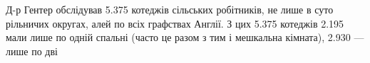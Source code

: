 Д-р Гентер обслідував \num{5.375} котеджів сільських робітників,
не лише в суто рільничих округах, алей по всіх графствах
Англії. З цих \num{5.375} котеджів \num{2.195} мали лише по одній спальні
(часто це разом з тим і мешкальна кімната), \num{2.930} — лише по дві
\parbreak{}  %
